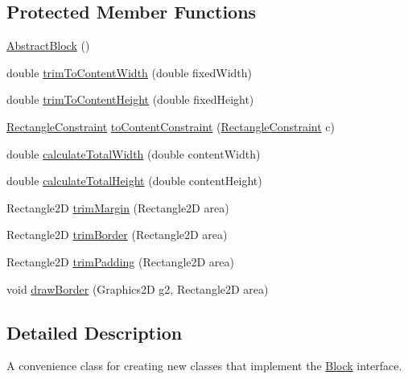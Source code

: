 \subsection*{Protected Member Functions}
\begin{DoxyCompactItemize}
\item 
\mbox{\hyperlink{classorg_1_1jfree_1_1chart_1_1block_1_1_abstract_block_ad26d622582beb50984fd722944ccc4e6}{Abstract\+Block}} ()
\item 
double \mbox{\hyperlink{classorg_1_1jfree_1_1chart_1_1block_1_1_abstract_block_a23ecdd7cb4d871588c23657c7d39e54c}{trim\+To\+Content\+Width}} (double fixed\+Width)
\item 
double \mbox{\hyperlink{classorg_1_1jfree_1_1chart_1_1block_1_1_abstract_block_ab26a8b24e4b47a2d9d4843d04f83c137}{trim\+To\+Content\+Height}} (double fixed\+Height)
\item 
\mbox{\hyperlink{classorg_1_1jfree_1_1chart_1_1block_1_1_rectangle_constraint}{Rectangle\+Constraint}} \mbox{\hyperlink{classorg_1_1jfree_1_1chart_1_1block_1_1_abstract_block_a84f5fdfb9a44ec0f07f33de54d40e261}{to\+Content\+Constraint}} (\mbox{\hyperlink{classorg_1_1jfree_1_1chart_1_1block_1_1_rectangle_constraint}{Rectangle\+Constraint}} c)
\item 
double \mbox{\hyperlink{classorg_1_1jfree_1_1chart_1_1block_1_1_abstract_block_a9f8343fc16a5da00d6481f63169644be}{calculate\+Total\+Width}} (double content\+Width)
\item 
double \mbox{\hyperlink{classorg_1_1jfree_1_1chart_1_1block_1_1_abstract_block_a20c78686a8ea0f6e6c160e5ac53e237e}{calculate\+Total\+Height}} (double content\+Height)
\item 
Rectangle2D \mbox{\hyperlink{classorg_1_1jfree_1_1chart_1_1block_1_1_abstract_block_a7dc204d6976b3c5c41cbb0aa6bd537dd}{trim\+Margin}} (Rectangle2D area)
\item 
Rectangle2D \mbox{\hyperlink{classorg_1_1jfree_1_1chart_1_1block_1_1_abstract_block_aef67c8cfeb741c4f7432d9f283f1408c}{trim\+Border}} (Rectangle2D area)
\item 
Rectangle2D \mbox{\hyperlink{classorg_1_1jfree_1_1chart_1_1block_1_1_abstract_block_ac83feddec58b91ac25c4805faf7f3a10}{trim\+Padding}} (Rectangle2D area)
\item 
void \mbox{\hyperlink{classorg_1_1jfree_1_1chart_1_1block_1_1_abstract_block_a5fa1b909d72192286ea09631d73064bf}{draw\+Border}} (Graphics2D g2, Rectangle2D area)
\end{DoxyCompactItemize}


\subsection{Detailed Description}
A convenience class for creating new classes that implement the \mbox{\hyperlink{interfaceorg_1_1jfree_1_1chart_1_1block_1_1_block}{Block}} interface. 

